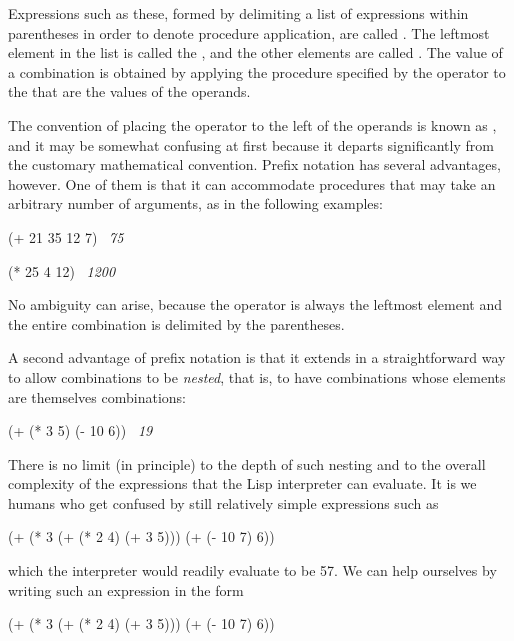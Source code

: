 \noindent
Expressions such as these, formed by delimiting a list of expressions within
parentheses in order to denote procedure application, are called
. The leftmost element in the list is called the
, and the other elements are called . The
value of a combination is obtained by applying the procedure specified by the
operator to the  that are the values of the operands.

The convention of placing the operator to the left of the operands is known as
, and it may be somewhat confusing at first because it
departs significantly from the customary mathematical convention. Prefix
notation has several advantages, however. One of them is that it can
accommodate procedures that may take an arbitrary number of arguments, as in
the following examples:

\begin{codeBlock}
(+ 21 35 12 7)
~\textit{75}~
\end{codeBlock}

\begin{codeBlock}
(* 25 4 12)
~\textit{1200}~
\end{codeBlock}

\noindent
No ambiguity can arise, because the operator is always the leftmost element and
the entire combination is delimited by the parentheses.

A second advantage of prefix notation is that it extends in a straightforward
way to allow combinations to be \textit{nested}, that is, to have combinations whose
elements are themselves combinations:

\begin{codeBlock}
(+ (* 3 5) (- 10 6))
~\textit{19}~
\end{codeBlock}

\noindent
There is no limit (in principle) to the depth of such nesting and to the
overall complexity of the expressions that the Lisp interpreter can evaluate.
It is we humans who get confused by still relatively simple expressions such as

\begin{codeBlock}
(+ (* 3 (+ (* 2 4) (+ 3 5))) (+ (- 10 7) 6))
\end{codeBlock}

\noindent
which the interpreter would readily evaluate to be 57.  We can help ourselves
by writing such an expression in the form

\begin{codeBlock}
(+ (* 3
      (+ (* 2 4)
         (+ 3 5)))
   (+ (- 10 7)
      6))
\end{codeBlock}

